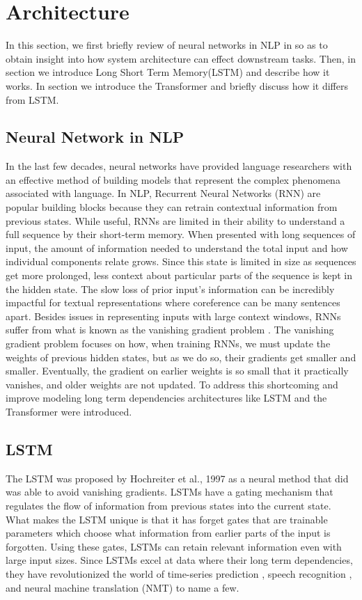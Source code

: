 \section{Architecture}
\label{chap:prior:sec:arch}
In this section, we first briefly review of neural networks in NLP in  so as to obtain insight into how system architecture can effect downstream tasks. Then, in section  we introduce Long Short Term Memory(LSTM) \cite{Hochreiter1997LongSM} and describe how it works. In section  we introduce the Transformer \cite{Vaswani2017AttentionIA} and briefly discuss how it differs from LSTM.
\subsection{Neural Network in NLP}
\label{chap:prior:sec:arch:nn}
In the last few decades, neural networks have provided language researchers with an effective method of building models that represent the complex phenomena associated with language. In NLP, Recurrent Neural Networks (RNN) are popular building blocks because they can retrain contextual information from previous states. While useful, RNNs are limited in their ability to understand a full sequence by their short-term memory. When presented with long sequences of input, the amount of information needed to understand the total input and how individual components relate grows. Since this state is limited in size as sequences get more prolonged, less context about particular parts of the sequence is kept in the hidden state. The slow loss of prior input's information can be incredibly impactful for textual representations where coreference can be many sentences apart. Besides issues in representing inputs with large context windows, RNNs suffer from what is known as the vanishing gradient problem \cite{Hochreiter1998TheVG}. The vanishing gradient problem focuses on how, when training RNNs, we must update the weights of previous hidden states, but as we do so, their gradients get smaller and smaller. Eventually, the gradient on earlier weights is so small that it practically vanishes, and older weights are not updated. To address this shortcoming and improve modeling long term dependencies architectures like LSTM and the Transformer were introduced. 
\subsection{LSTM}
\label{chap:prior:sec:arch:lstm}
The LSTM was proposed by Hochreiter et al.,  1997 \cite{Hochreiter1997LongSM} as a neural method that did was able to avoid vanishing gradients. LSTMs have a gating mechanism that regulates the flow of information from previous states into the current state. What makes the LSTM unique is that it has forget gates that are trainable parameters which choose what information from earlier parts of the input is forgotten. Using these gates, LSTMs can retain relevant information even with large input sizes. Since LSTMs excel at data where their long term dependencies, they have revolutionized the world of time-series prediction \cite{Sagheer2019TimeSF}, speech recognition \cite{Han2017ESEES}, and neural machine translation (NMT) \cite{Jean2015OnUV} to name a few. 
